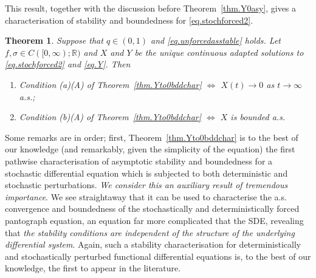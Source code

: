 \documentclass[a4paper,10pt,reqno]{amsart}
\numberwithin{equation}{section}
\newtheorem{theorem}{Theorem}
\theoremstyle{definition}
\theoremstyle{remark}
\DeclareMathOperator{\1}{\mathbbm 1}
\begin{document}
This result, together with the discussion before Theorem~\ref{thm.Y0asy},  gives a characterisation of stability and  boundedness for \eqref{eq.stochforced2}.
\begin{theorem}\label{thm.stochstabtilX1}
Suppose that $q\in (0,1)$ and \eqref{eq.unforcedasstable} holds. Let $f,\sigma\in C([0,\infty);\mathbb{R})$ and $X$ and $Y$ be the unique continuous adapted solutions to \eqref{eq.stochforced2} and \eqref{eq.Y}. Then
\begin{enumerate}
	\item[(i)] Condition (a)(A) of Theorem~\ref{thm.Yto0bddchar}
	$\Longleftrightarrow$ $X(t)\to 0$ as $t\to\infty$ a.s.;
	\item[(ii)] Condition (b)(A) of Theorem~\ref{thm.Yto0bddchar} $\Longleftrightarrow$  $X$ is bounded a.s. 
\end{enumerate}
\end{theorem}
Some remarks are in order; first, Theorem~\ref{thm.Yto0bddchar} is to the best of our knowledge (and remarkably, given the simplicity of the equation) the first pathwise characterisation of asymptotic stability and boundedness for a stochastic differential equation which is subjected to both deterministic and stochastic perturbations. \textit{We consider this an auxiliary result of tremendous importance}. We see straightaway that it can be used to characterise the a.s. convergence and boundedness of the stochastically and deterministically forced pantograph equation, an equation far more complicated that the SDE, revealing that \textit{the stability conditions are independent of the structure of the underlying differential system}. Again, such a stability characterisation for deterministically and stochastically perturbed functional differential equations is, to the best of our knowledge, the first to appear in the literature.  
\end{document}
